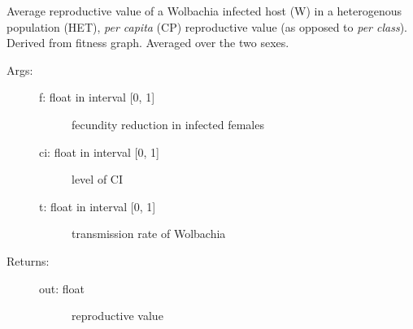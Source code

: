 \documentclass[letterpaper,10pt,english]{sphinxmanual}
\begin{document}
\begin{fulllineitems}
\label{index:wspec.analytical.reproval_WHETCP}
Average reproductive value of a Wolbachia infected host (W) in 
a heterogenous population (HET), \emph{per capita} (CP) reproductive 
value (as opposed to \emph{per class}). Derived from fitness graph. 
Averaged over the two sexes.
\begin{description}
\item[{Args:}] \leavevmode\begin{description}
\item[{f: float in interval {[}0, 1{]}}] \leavevmode
fecundity reduction in infected females

\item[{ci: float in interval {[}0, 1{]}}] \leavevmode
level of CI

\item[{t: float in interval {[}0, 1{]}}] \leavevmode
transmission rate of Wolbachia

\end{description}

\item[{Returns:}] \leavevmode\begin{description}
\item[{out: float}] \leavevmode
reproductive value

\end{description}

\end{description}

\end{fulllineitems}

\end{document}
